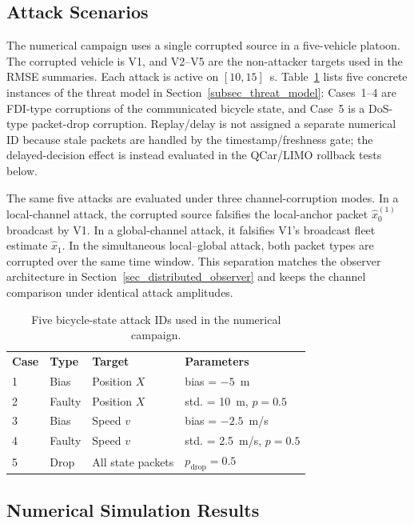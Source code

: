\documentclass[letterpaper,journal]{IEEEtran}
\begin{document}
\subsection{Attack Scenarios}\label{sec:attack_scenarios}
The numerical campaign uses a single corrupted source in a five-vehicle platoon. The corrupted vehicle is V1, and V2--V5 are the non-attacker targets used in the RMSE summaries. Each attack is active on $[10,15]$~s. Table~\ref{tab:attack_mix} lists five concrete instances of the threat model in Section~\ref{subsec_threat_model}: Cases~1--4 are FDI-type corruptions of the communicated bicycle state, and Case~5 is a DoS-type packet-drop corruption. Replay/delay is not assigned a separate numerical ID because stale packets are handled by the timestamp/freshness gate; the delayed-decision effect is instead evaluated in the QCar/LIMO rollback tests below.

The same five attacks are evaluated under three channel-corruption modes. In a local-channel attack, the corrupted source falsifies the local-anchor packet $\hat{x}_0^{(1)}$ broadcast by V1. In a global-channel attack, it falsifies V1's broadcast fleet estimate $\hat{x}_1$. In the simultaneous local--global attack, both packet types are corrupted over the same time window. This separation matches the observer architecture in Section~\ref{sec_distributed_observer} and keeps the channel comparison under identical attack amplitudes.

\begin{table}[!ht]
\centering
\caption{Five bicycle-state attack IDs used in the numerical campaign.}
\label{tab:attack_mix}
\scriptsize
\begin{tabular}{p{0.7cm}p{1.35cm}p{2.0cm}p{3.0cm}}
\toprule
\textbf{Case} & \textbf{Type} & \textbf{Target} & \textbf{Parameters} \\
1 & Bias & Position $X$ & bias = $-5$~m \\
2 & Faulty & Position $X$ & std. = 10~m, $p = 0.5$ \\
3 & Bias & Speed $v$ & bias = $-2.5$~m/s \\
4 & Faulty & Speed $v$ & std. = 2.5~m/s, $p = 0.5$ \\
5 & Drop & All state packets & $p_\text{drop} = 0.5$ \\
\bottomrule
\end{tabular}
\end{table}

\subsection{Numerical Simulation Results}
\end{document}
